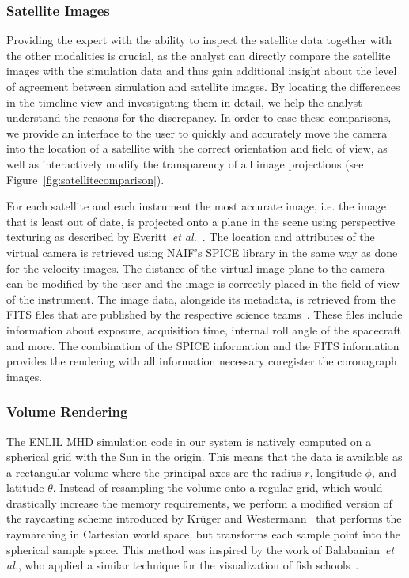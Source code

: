 \documentclass[journal]{vgtc}                %
\def\etal{\textit{et al.}}
\def\etal{\textit{et al.}}
\begin{document}
\subsubsection{Satellite Images} \label{sec:satelltes}
Providing the expert with the ability to inspect the satellite data together with the other modalities is crucial, as the analyst can directly compare the satellite images with the simulation data and thus gain additional insight about the level of agreement between simulation and satellite images. By locating the differences in the timeline view and investigating them in detail, we help the analyst understand the reasons for the discrepancy. In order to ease these comparisons, we provide an interface to the user to quickly and accurately move the camera into the location of a satellite with the correct orientation and field of view, as well as interactively modify the transparency of all image projections (see Figure~\ref{fig:satellitecomparison}).

For each satellite and each instrument the most accurate image, i.e. the image that is least out of date, is projected onto a plane in the scene using perspective texturing as described by Everitt~\etal~\cite{Everitt:2001tg}. The location and attributes of the virtual camera is retrieved using NAIF's SPICE library in the same way as done for the velocity images. The distance of the virtual image plane to the camera can be modified by the user and the image is correctly placed in the field of view of the instrument. The image data, alongside its metadata, is retrieved from the FITS files that are published by the respective science teams~\cite{wells1981fits}. These files include information about exposure, acquisition time, internal roll angle of the spacecraft and more. The combination of the SPICE information and the FITS information provides the rendering with all information necessary coregister the coronagraph images.

\subsubsection{Volume Rendering} \label{sec:volumerendering}
The ENLIL MHD simulation code in our system is natively computed on a spherical grid with the Sun in the origin. This means that the data is available as a rectangular volume where the principal axes are the radius $r$, longitude $\phi$, and latitude $\theta$. Instead of resampling the volume onto a regular grid, which would drastically increase the memory requirements, we perform a modified version of the raycasting scheme introduced by Kr\"uger and Westermann~\cite{Kruger:2003ge} that performs the raymarching in Cartesian world space, but transforms each sample point into the spherical sample space. This method was inspired by the work of Balabanian~\etal , who applied a similar technique for the visualization of fish schools~\cite{balabanian-2007-ant}.
\end{document}
